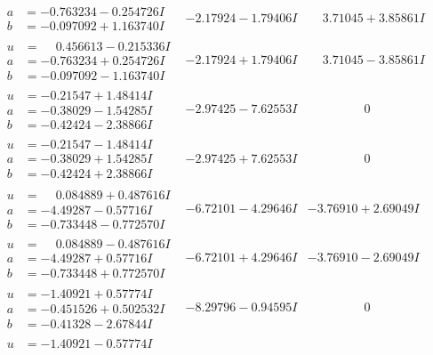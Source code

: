 \documentclass[1p]{elsarticle_modified}
\theoremstyle{definition}
\begin{document}
$$\begin{array}{c|c|c}
\begin{aligned}
a &= -0.763234 - 0.254726 I \\
b &= -0.097092 + 1.163740 I\end{aligned}
 & -2.17924 - 1.79406 I & \phantom{-}3.71045 + 3.85861 I \\ \hline\begin{aligned}
u &= \phantom{-}0.456613 - 0.215336 I \\
a &= -0.763234 + 0.254726 I \\
b &= -0.097092 - 1.163740 I\end{aligned}
 & -2.17924 + 1.79406 I & \phantom{-}3.71045 - 3.85861 I \\ \hline\begin{aligned}
u &= -0.21547 + 1.48414 I \\
a &= -0.38029 - 1.54285 I \\
b &= -0.42424 - 2.38866 I\end{aligned}
 & -2.97425 - 7.62553 I & \phantom{-0.000000 } 0 \\ \hline\begin{aligned}
u &= -0.21547 - 1.48414 I \\
a &= -0.38029 + 1.54285 I \\
b &= -0.42424 + 2.38866 I\end{aligned}
 & -2.97425 + 7.62553 I & \phantom{-0.000000 } 0 \\ \hline\begin{aligned}
u &= \phantom{-}0.084889 + 0.487616 I \\
a &= -4.49287 - 0.57716 I \\
b &= -0.733448 - 0.772570 I\end{aligned}
 & -6.72101 - 4.29646 I & -3.76910 + 2.69049 I \\ \hline\begin{aligned}
u &= \phantom{-}0.084889 - 0.487616 I \\
a &= -4.49287 + 0.57716 I \\
b &= -0.733448 + 0.772570 I\end{aligned}
 & -6.72101 + 4.29646 I & -3.76910 - 2.69049 I \\ \hline\begin{aligned}
u &= -1.40921 + 0.57774 I \\
a &= -0.451526 + 0.502532 I \\
b &= -0.41328 - 2.67844 I\end{aligned}
 & -8.29796 - 0.94595 I & \phantom{-0.000000 } 0 \\ \hline\begin{aligned}
u &= -1.40921 - 0.57774 I \\

\end{aligned}
\end{array}$$
\end{document}
